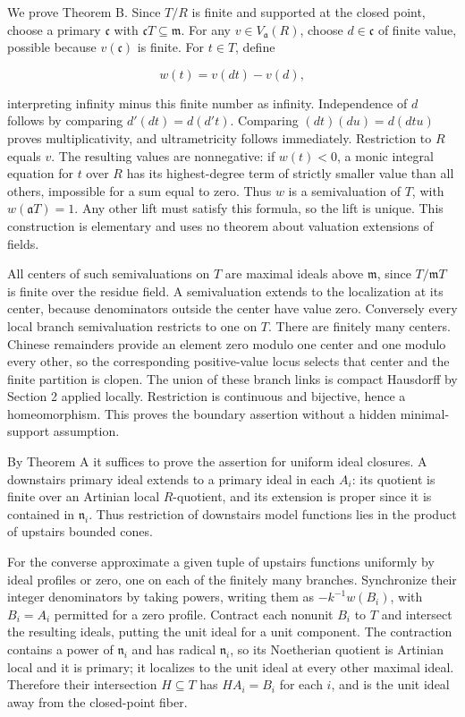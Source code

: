 \documentclass[11pt]{article}
\begin{document}
We prove Theorem B. Since \(T/R\) is finite and supported at the closed point, choose a primary \(\mathfrak c\) with \(\mathfrak cT\subseteq\mathfrak m\). For any \(v\in V_{\mathfrak a}(R)\), choose \(d\in\mathfrak c\) of finite value, possible because \(v(\mathfrak c)\) is finite. For \(t\in T\), define

\[
w(t)=v(dt)-v(d),
\]

interpreting infinity minus this finite number as infinity. Independence of \(d\) follows by comparing \(d'(dt)=d(d't)\). Comparing \((dt)(du)=d(dtu)\) proves multiplicativity, and ultrametricity follows immediately. Restriction to \(R\) equals \(v\). The resulting values are nonnegative: if \(w(t)<0\), a monic integral equation for \(t\) over \(R\) has its highest-degree term of strictly smaller value than all others, impossible for a sum equal to zero. Thus \(w\) is a semivaluation of \(T\), with \(w(\mathfrak aT)=1\). Any other lift must satisfy this formula, so the lift is unique. This construction is elementary and uses no theorem about valuation extensions of fields.

All centers of such semivaluations on \(T\) are maximal ideals above \(\mathfrak m\), since \(T/\mathfrak mT\) is finite over the residue field. A semivaluation extends to the localization at its center, because denominators outside the center have value zero. Conversely every local branch semivaluation restricts to one on \(T\). There are finitely many centers. Chinese remainders provide an element zero modulo one center and one modulo every other, so the corresponding positive-value locus selects that center and the finite partition is clopen. The union of these branch links is compact Hausdorff by Section 2 applied locally. Restriction is continuous and bijective, hence a homeomorphism. This proves the boundary assertion without a hidden minimal-support assumption.

By Theorem A it suffices to prove the assertion for uniform ideal closures. A downstairs primary ideal extends to a primary ideal in each \(A_i\): its quotient is finite over an Artinian local \(R\)-quotient, and its extension is proper since it is contained in \(\mathfrak n_i\). Thus restriction of downstairs model functions lies in the product of upstairs bounded cones.

For the converse approximate a given tuple of upstairs functions uniformly by ideal profiles or zero, one on each of the finitely many branches. Synchronize their integer denominators by taking powers, writing them as \(-k^{-1}w(B_i)\), with \(B_i=A_i\) permitted for a zero profile. Contract each nonunit \(B_i\) to \(T\) and intersect the resulting ideals, putting the unit ideal for a unit component. The contraction contains a power of \(\mathfrak n_i\) and has radical \(\mathfrak n_i\), so its Noetherian quotient is Artinian local and it is primary; it localizes to the unit ideal at every other maximal ideal. Therefore their intersection \(H\subseteq T\) has \(HA_i=B_i\) for each \(i\), and is the unit ideal away from the closed-point fiber.
\end{document}
